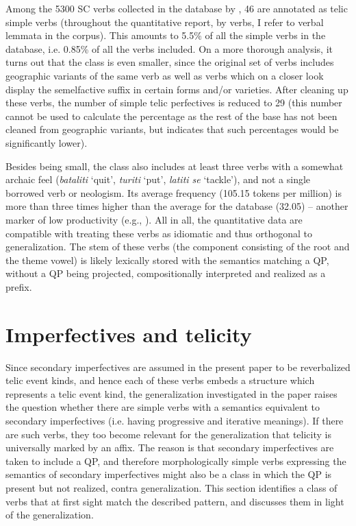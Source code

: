 \documentclass[output=paper]{langscibook}
\begin{document}
Among the 5300 SC verbs collected in the database by \citet{Arsetal.2021}, 46 are annotated as telic simple verbs (throughout the quantitative report, by verbs, I refer to verbal lemmata in the corpus). This amounts to 5.5\% of all the simple verbs in the database, i.e. 0.85\% of all the verbs included. On a more thorough analysis, it turns out that the class is even smaller, since the original set of verbs includes geographic variants of the same verb as well as verbs which on a closer look display the semelfactive suffix in certain forms and\slash or varieties. After cleaning up these verbs, the number of simple telic perfectives is reduced to 29 (this number cannot be used to calculate the percentage as the rest of the base has not been cleaned from geographic variants, but indicates that such percentages would be significantly lower). 

Besides being small, the class also includes at least three verbs with a somewhat archaic feel (\textit{bataliti} `quit', \textit{turiti} `put', \textit{latiti se} `tackle'), and not a single borrowed verb or neologism. Its average frequency (105.15 tokens per million) is more than three times higher than the average for the database (32.05) -- another marker of low productivity (e.g., \cite[22--35]{Plag.2012}). All in all, the quantitative data are compatible with treating these verbs as idiomatic and thus orthogonal to  generalization. The stem of these verbs (the component consisting of the root and the theme vowel) is likely lexically stored with the semantics matching a QP, without a QP being projected, compositionally interpreted and realized as a prefix.


\section{Imperfectives and telicity}\label{ars:sec:s-simpleimperf}\largerpage

Since secondary imperfectives are assumed in the present paper to be reverbalized telic event kinds, and hence each of these verbs embeds a structure which represents a telic event kind, the generalization investigated in the paper raises the question whether there are simple verbs with a semantics equivalent to secondary imperfectives (i.e. having progressive and iterative meanings). If there are such verbs, they too become relevant for the generalization that telicity is universally marked by an affix. The reason is that secondary imperfectives are taken to include a QP, and therefore morphologically simple verbs expressing the semantics of secondary imperfectives might also be a class in which the QP is present but not realized, contra  generalization. This section identifies a class of verbs that at first sight match the described pattern, and discusses them in light of the generalization. 
\end{document}
